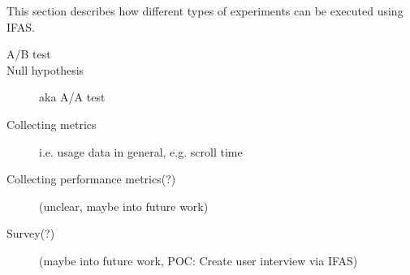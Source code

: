 This section describes how different types of experiments can be executed using \ac{IFAS}.

\begin{description}
\item[A/B test]
\item[Null hypothesis] aka A/A test \cite{Kohavi2009}
\item[Collecting metrics] i.e. usage data in general, e.g. scroll time
\item[Collecting performance metrics(?)] (unclear, maybe into future work)
\item[Survey(?)] (maybe into future work, POC: Create user interview via \ac{IFAS})
\end{description}

